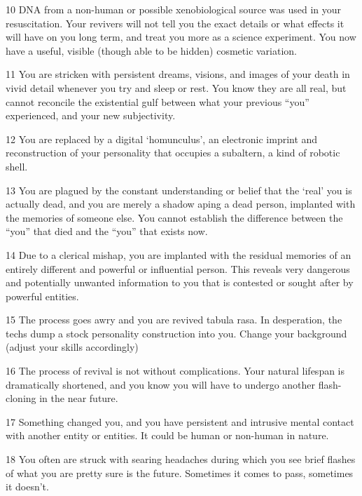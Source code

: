 10         DNA from a non-human or possible xenobiological source was used in your resuscitation. Your  
           revivers will not tell you the exact details or what effects it will have on you long term, and treat  
           you more as a science experiment. You now have a useful, visible (though able to be hidden)  
           cosmetic variation.  

11         You are stricken with persistent dreams, visions, and images of your death in vivid detail  
           whenever you try and sleep or rest. You know they are all real, but cannot reconcile the  
           existential gulf between what your previous “you” experienced, and your new subjectivity.   

12         You are replaced by a digital ‘homunculus’, an electronic imprint and reconstruction of your  
           personality that occupies a subaltern, a kind of robotic shell.  

13         You are plagued by the constant understanding or belief that the ‘real’ you is actually dead,  
           and you are merely a shadow aping a dead person, implanted with the memories of someone  
           else. You cannot establish the difference between the “you” that died and the “you” that exists  
           now. 

14         Due to a clerical mishap, you are implanted with the residual memories of an entirely different  
           and powerful or influential person. This reveals very dangerous and potentially unwanted  
           information to you that is contested or sought after by powerful entities. 

15         The process goes awry and you are revived tabula rasa. In desperation, the techs dump a  
           stock personality construction into you. Change your background (adjust your skills  
           accordingly) 

16         The process of revival is not without complications. Your natural lifespan is dramatically  
           shortened, and you know you will have to undergo another flash-cloning in the near future.  

17         Something changed you, and you have persistent and intrusive mental contact with another  
           entity or entities. It could be human or non-human in nature. 

18         You often are struck with searing headaches during which you see brief flashes of what you  
           are pretty sure is the future. Sometimes it comes to pass, sometimes it doesn’t.  

